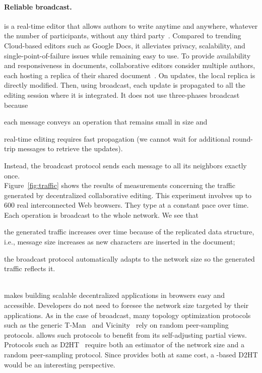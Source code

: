 \paragraph{Reliable broadcast.} \CRATE is a real-time editor that allows authors
to write anytime and anywhere, whatever the number of participants, without any
third party~\cite{nedelec2016crate}. Compared to trending Cloud-based editors
such as Google Docs, it alleviates privacy, scalability, and
single-point-of-failure issues while remaining easy to use.  To provide
availability and responsiveness in documents, collaborative editors consider
multiple authors, each hosting a replica of their shared
document~\cite{saito2005optimistic}.  On updates, the local replica is directly
modified. Then, using broadcast, each update is propagated to all the editing
session where it is integrated.  It does not use three-phases broadcast because
\begin{inparaenum}[(i)]
\item each message conveys an operation that remains small in size and
\item real-time editing requires fast propagation (we cannot wait for additional
  round-trip messages to retrieve the updates).
\end{inparaenum} Instead, the broadcast protocol sends each message to all its
neighbors exactly once. \\
Figure~\ref{fig:traffic} shows the results of measurements concerning the
traffic generated by decentralized collaborative editing. This experiment
involves up to 600 real interconnected Web browsers. They type at a constant
pace over time. Each operation is broadcast to the whole network. We see that
\begin{inparaenum}
\item the generated traffic increases over time because of the replicated data
  structure, i.e., message size increases as new characters are inserted in the
  document;
\item the broadcast protocol automatically adapts to the network size so the
  generated traffic reflects it.
\end{inparaenum}

\ \\

\SPRAY makes building scalable decentralized applications in browsers
easy and accessible.  Developers do not need to foresee the network
size targeted by their applications. As in the case of broadcast, many
topology optimization protocols such as the generic
T-Man~\cite{jelasity2009tman} and
Vicinity~\cite{voulgaris2005epidemic} rely on random peer-sampling
protocols. \SPRAY allows such protocols to benefit from its
self-adjusting partial views. Protocols such as
D2HT~\cite{bertier-d2ht} require both an estimator of the network size
and a random peer-sampling protocol. Since \SPRAY provides both at
same cost, a \SPRAY-based D2HT would be an interesting perspective.

